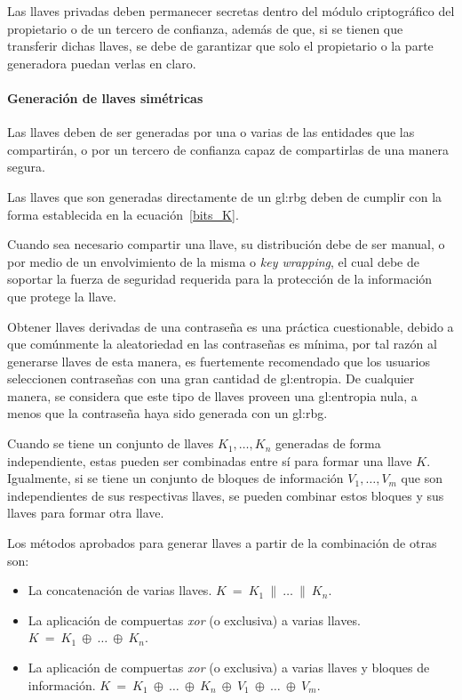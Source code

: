 Las llaves privadas deben permanecer secretas dentro del módulo criptográfico
del propietario o de un tercero de confianza, además de que, si se tienen que
transferir dichas llaves, se debe de garantizar que solo el propietario o la
parte generadora puedan verlas en claro.

\paragraph{Generación de llaves simétricas}
Las llaves deben de ser generadas por una o varias de las entidades que
las compartirán, o por un tercero de confianza capaz de compartirlas de una
manera segura.

Las llaves que son generadas directamente de un \gls{gl:rbg} deben de cumplir
con la forma establecida en la ecuación~\ref{bits_K}.

Cuando sea necesario compartir una llave, su distribución debe de ser manual,
o por medio de un envolvimiento de la misma o \textit{key wrapping}, el cual
debe de soportar la fuerza de seguridad requerida para la protección de la
información que protege la llave.

Obtener llaves derivadas de una contraseña es una práctica cuestionable,
debido a que comúnmente la aleatoriedad en las contraseñas es mínima, por tal
razón al generarse llaves de esta manera, es fuertemente recomendado que los
usuarios seleccionen contraseñas con una gran cantidad de \gls{gl:entropia}.
De cualquier manera, se considera que este tipo de llaves proveen una
\gls{gl:entropia} nula, a menos que la contraseña haya sido generada con
un \gls{gl:rbg}.

Cuando se tiene un conjunto de llaves $K_1, \dots, K_n$ generadas de forma
independiente, estas pueden ser combinadas entre sí para formar una llave $K$.
Igualmente, si se tiene un conjunto de bloques de información $V_1, \dots,
V_m$ que son independientes de sus respectivas llaves, se pueden combinar
estos bloques y sus llaves para formar otra llave.

Los métodos aprobados para generar llaves a partir de la combinación de
otras son:
\begin{itemize}

  \item La concatenación de varias llaves.
    $K\: =\: K_1\: \parallel\: \dots\: \parallel\: K_n$.

  \item La aplicación de compuertas \textit{xor} (o exclusiva) a varias llaves.
    $K\: =\: K_1\: \oplus\: \dots\: \oplus\: K_n$.

  \item La aplicación de compuertas \textit{xor} (o exclusiva) a varias llaves
    y bloques de información.
    $K\: =\: K_1\: \oplus\: \dots\: \oplus\: K_n\:
    \oplus\: V_1\: \oplus\: \dots\: \oplus\: V_m$.

\end{itemize}

